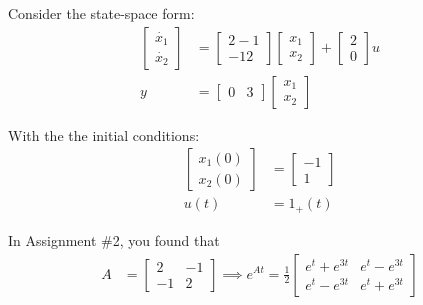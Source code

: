 \section{}
Consider the state-space form:
\[
\begin{aligned}
    \begin{bmatrix}
        \dot{x_1} \\
        \dot{x_2}
    \end{bmatrix}
    &=
    \begin{bmatrix}
        2 -1 \\
        -1 2
    \end{bmatrix}
    \begin{bmatrix}
        x_1 \\
        x_2
    \end{bmatrix}
    + 
    \begin{bmatrix}
        2 \\
        0
    \end{bmatrix}
    u \\
    y &=
    \begin{bmatrix}
        0 & 3
    \end{bmatrix}
    \begin{bmatrix}
        x_1 \\
        x_2
    \end{bmatrix}
\end{aligned}
\]

With the the initial conditions:
\[
\begin{aligned}
    \begin{bmatrix}
        x_1(0) \\
        x_2(0)
    \end{bmatrix}
    &=
    \begin{bmatrix}
        -1 \\
        1
    \end{bmatrix}\\
    u(t) &= 1_{+}(t)
\end{aligned}
\]

In Assignment \#2, you found that
\[
\begin{aligned}
        A &=
        \begin{bmatrix}
            2 & -1 \\
            -1 & 2
        \end{bmatrix} 
        \implies 
        e^{At} =
        \frac{1}{2}
        \begin{bmatrix}
            e^t + e^{3t} & e^t - e^{3t} \\
            e^t - e^{3t} & e^t + e^{3t}
        \end{bmatrix} \\
\end{aligned}
\]

